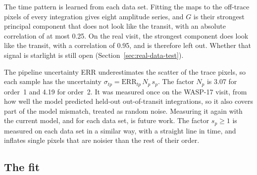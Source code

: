The time pattern is learned from each data set. Fitting the maps to the
off-trace pixels of every integration gives eight amplitude series, and $G$
is their strongest principal component that does not look like the transit,
with an absolute correlation of at most 0.25. On the real visit, the strongest component
does look like the transit, with a correlation of 0.95, and is therefore left
out. Whether that signal is starlight is still open
(Section~\ref{sec:real-data-test}).

The pipeline uncertainty ERR underestimates the scatter of the trace pixels,
so each sample has the uncertainty
$\sigma_{tp}=\mathrm{ERR}_{tp}\,N_{p}\,s_{p}$. The factor $N_p$ is 3.07 for
order~1 and 4.19 for order~2. It was measured once on the WASP-17 visit, from
how well the model predicted held-out out-of-transit integrations, so it also
covers part of the model mismatch, treated as random noise. Measuring it again
with the current model, and for each data set, is future work. The factor
$s_p\geq1$ is measured on each data set in a similar way, with a straight line
in time, and inflates single pixels that are noisier than the rest of their
order.

\subsection{The fit}

